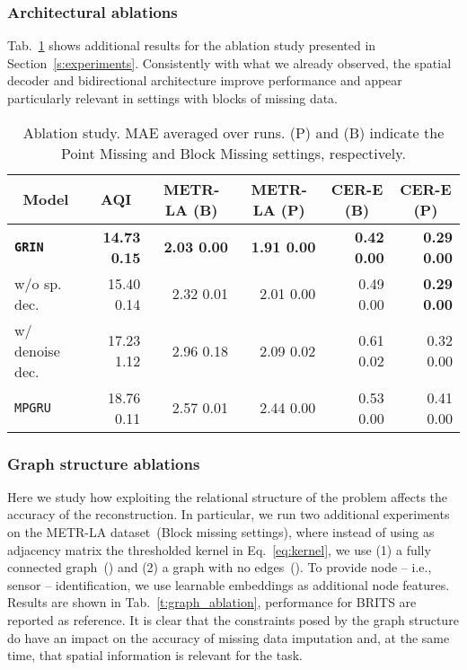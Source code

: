 \documentclass{article} \usepackage{iclr2022_conference,times}
\newcommand{\GRIL}{\texttt{GRIN}}
\begin{document}
\subsubsection{Architectural ablations}
\label{a:ablation}
Tab.~\ref{t:ablation_full} shows additional results for the ablation study presented in Section~\ref{s:experiments}. Consistently with what we already observed, the spatial decoder and bidirectional architecture improve performance and appear particularly relevant in settings with blocks of missing data.
\begin{table}[ht]
\vspace{-0.2cm}
\caption{Ablation study. MAE averaged over  runs. (P) and (B) indicate the Point Missing and Block Missing settings, respectively.}
\vspace{0.1cm}
\centering
\begin{tabular}{ l | r | r | r | r | r }
\toprule
 \multicolumn{1}{c}{Model}&\multicolumn{1}{|c}{AQI} & \multicolumn{1}{|c}{METR-LA (B)} & \multicolumn{1}{|c}{METR-LA (P)} & \multicolumn{1}{|c}{CER-E (B)} & \multicolumn{1}{|c}{CER-E (P)} \\
\midrule
\texttt{\textbf{\GRIL}}  & \textbf{14.73} {\tiny  \textbf{0.15}} & \textbf{2.03 {\tiny  0.00}} & \textbf{1.91 {\tiny  0.00}} & \textbf{0.42 {\tiny  0.00}} & \textbf{0.29 {\tiny  0.00}}\\
\midrule[0.3pt]
w/o sp. dec. & 15.40 {\tiny  0.14} & 2.32 {\tiny  0.01} & 2.01 {\tiny  0.00} & 0.49 {\tiny  0.00} & \textbf{0.29 {\tiny  0.00}}\\
w/ denoise dec. & 17.23 {\tiny  1.12} & 2.96 {\tiny  0.18} & 2.09 {\tiny  0.02} & 0.61 {\tiny  0.02} & 0.32 {\tiny  0.00}\\
\texttt{MPGRU} & 18.76 {\tiny  0.11} & 2.57 {\tiny  0.01} & 2.44 {\tiny  0.00} & 0.53 {\tiny  0.00} & 0.41 {\tiny  0.00}\\
\bottomrule
\end{tabular}
\label{t:ablation_full}
\end{table} 
\subsubsection{Graph structure ablations}

Here we study how exploiting the relational structure of the problem affects the accuracy of the reconstruction. In particular, we run two additional experiments on the METR-LA dataset~(Block missing settings), where instead of using as adjacency matrix the thresholded kernel in Eq.~\ref{eq:kernel}, we use (1) a fully connected graph~() and (2) a graph with no edges~(). To provide node -- i.e., sensor -- identification, we use learnable embeddings as additional node features. Results are shown in Tab.~\ref{t:graph_ablation}, performance for BRITS are reported as reference. It is clear that the constraints posed by the graph structure do have an impact on the accuracy of missing data imputation and, at the same time, that spatial information is relevant for the task.
\end{document}
